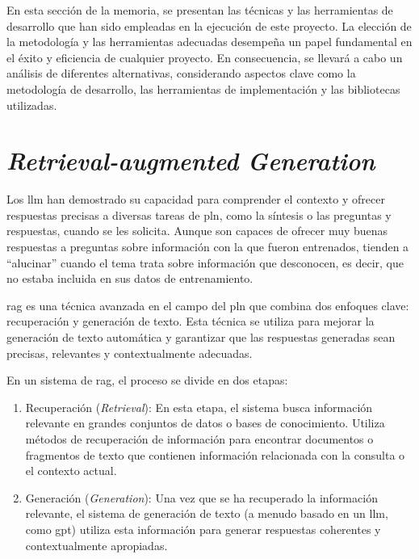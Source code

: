 
En esta sección de la memoria, se presentan las técnicas y las herramientas de desarrollo que han sido empleadas en la ejecución de este proyecto. La elección de la metodología y las herramientas adecuadas desempeña un papel fundamental en el éxito y eficiencia de cualquier proyecto. En consecuencia, se llevará a cabo un análisis de diferentes alternativas, considerando aspectos clave como la metodología de desarrollo, las herramientas de implementación y las bibliotecas utilizadas.

\section{\textit{Retrieval-augmented Generation}}

Los \acrshort{llm} han demostrado su capacidad para comprender el contexto y ofrecer respuestas precisas a diversas tareas de \acrlong{pln}, como la síntesis o las preguntas y respuestas, cuando se les solicita. Aunque son capaces de ofrecer muy buenas respuestas a preguntas sobre información con la que fueron entrenados, tienden a ``alucinar'' cuando el tema trata sobre información que desconocen, es decir, que no estaba incluida en sus datos de entrenamiento.

\acrlong{rag} es una técnica avanzada en el campo del \acrshort{pln} que combina dos enfoques clave: recuperación y generación de texto. Esta técnica se utiliza para mejorar la generación de texto automática y garantizar que las respuestas generadas sean precisas, relevantes y contextualmente adecuadas\cite{Lewis2020}.

En un sistema de \acrshort{rag}, el proceso se divide en dos etapas:

\begin{enumerate}
    \item Recuperación (\textit{Retrieval}): En esta etapa, el sistema busca información relevante en grandes conjuntos de datos o bases de conocimiento. Utiliza métodos de recuperación de información para encontrar documentos o fragmentos de texto que contienen información relacionada con la consulta o el contexto actual.

    \item Generación (\textit{Generation}): Una vez que se ha recuperado la información relevante, el sistema de generación de texto (a menudo basado en un \acrshort{llm}, como \acrshort{gpt}) utiliza esta información para generar respuestas coherentes y contextualmente apropiadas.
    
\end{enumerate}


